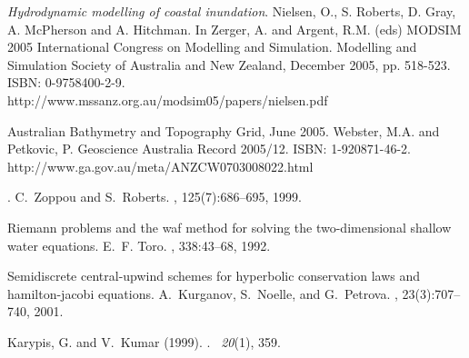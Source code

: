 \documentclass{manual}
\begin{document}

%
%
%




\begin{thebibliography}{99}
{\it Hydrodynamic modelling of coastal inundation}.
Nielsen, O., S. Roberts, D. Gray, A. McPherson and A. Hitchman.
In Zerger, A. and Argent, R.M. (eds) MODSIM 2005 International Congress on
Modelling and Simulation. Modelling and Simulation Society of Australia and
New Zealand, December 2005, pp. 518-523. ISBN: 0-9758400-2-9.\\
http://www.mssanz.org.au/modsim05/papers/nielsen.pdf

Australian Bathymetry and Topography Grid, June 2005.
Webster, M.A. and Petkovic, P.
Geoscience Australia Record 2005/12. ISBN: 1-920871-46-2.\\
http://www.ga.gov.au/meta/ANZCW0703008022.html

.
\newblock C.~Zoppou and S.~Roberts.
, 125(7):686--695, 1999.

\newblock Riemann problems and the waf method for solving the two-dimensional
  shallow water equations.
\newblock E.~F. Toro.
,
  338:43--68, 1992.

\newblock Semidiscrete central-upwind schemes for hyperbolic conservation laws
  and hamilton-jacobi equations.
\newblock A.~Kurganov, S.~Noelle, and G.~Petrova.
, 23(3):707--740, 2001.




Karypis, G. and V.~Kumar (1999).
.
~{\em 20\/}(1), 359.


\end{thebibliography}
\end{document}
